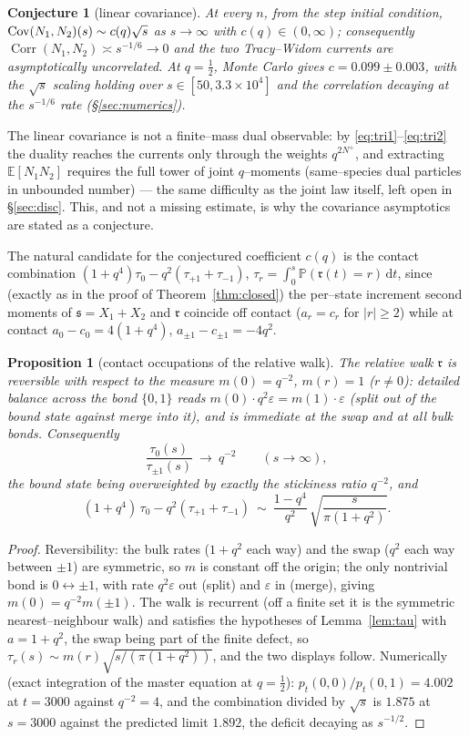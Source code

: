 \documentclass[11pt]{article}
\theoremstyle{plain}
\newtheorem{proposition}[theorem]{Proposition}
\newtheorem{conjecture}[theorem]{Conjecture}
\theoremstyle{definition}
\theoremstyle{remark}
\DeclareMathOperator{\Corr}{Corr}\DeclareMathOperator{\cum}{cum}
\newcommand{\E}{\mathbb{E}}\newcommand{\PP}{\mathbb{P}}\newcommand{\dd}{\,\mathrm{d}}
\newcommand{\eps}{\varepsilon}\newcommand{\Exp}{\mathrm{Exp}}
\begin{document}
\begin{conjecture}[linear covariance]\label{conj:cov}
At every $n$, from the step initial condition,
$\operatorname{Cov}(N_1,N_2)(s)\sim c(q)\sqrt s$ as $s\to\infty$ with $c(q)\in(0,\infty)$;
consequently $\Corr(N_1,N_2)\asymp s^{-1/6}\to0$ and the two Tracy--Widom currents
are asymptotically uncorrelated. At $q=\tfrac12$, Monte Carlo gives
$c=0.099\pm0.003$, with the $\sqrt s$ scaling holding over
$s\in[50,3.3\times10^4]$ and the correlation decaying at the $s^{-1/6}$ rate
(\S\ref{sec:numerics}).
\end{conjecture}

The linear covariance is not a finite--mass dual observable: by
\eqref{eq:tri1}--\eqref{eq:tri2} the duality reaches the currents only through the
weights $q^{2N^+}$, and extracting $\E[N_1N_2]$ requires the full tower of joint
$q$--moments (same--species dual particles in unbounded number) --- the same
difficulty as the joint law itself, left open in \S\ref{sec:disc}. This, and not a
missing estimate, is why the covariance asymptotics are stated as a conjecture.

The natural candidate for the conjectured coefficient $c(q)$ is the contact
combination
$(1+q^4)\tau_0-q^2(\tau_{+1}+\tau_{-1})$, $\tau_r=\int_0^s\PP(\mathfrak r(t)=r)\dd t$,
since (exactly as in the proof of Theorem~\ref{thm:closed}) the per--state increment
second moments of $\mathfrak s=X_1+X_2$ and $\mathfrak r$ coincide off contact
($a_r=c_r$ for $|r|\ge2$) while at contact $a_0-c_0=4(1+q^4)$,
$a_{\pm1}-c_{\pm1}=-4q^2$. 

\begin{proposition}[contact occupations of the relative walk]\label{prop:occ}
The relative walk $\mathfrak r$ is reversible with respect to the measure
$m(0)=q^{-2}$, $m(r)=1$ \textup($r\ne0$\textup): detailed balance across the bond
$\{0,1\}$ reads $m(0)\cdot q^2\eps=m(1)\cdot\eps$ \textup(split out of the bound state
against merge into it\textup), and is immediate at the swap and at all bulk bonds.
Consequently
\[
  \frac{\tau_0(s)}{\tau_{\pm1}(s)}\ \longrightarrow\ q^{-2}\qquad(s\to\infty),
\]
the bound state being overweighted by exactly the stickiness ratio $q^{-2}$, and
\[
  (1+q^4)\,\tau_0-q^2(\tau_{+1}+\tau_{-1})\ \sim\
  \frac{1-q^4}{q^{2}}\,\sqrt{\frac{s}{\pi(1+q^2)}}.
\]
\end{proposition}
\begin{proof}
Reversibility: the bulk rates ($1+q^2$ each way) and the swap ($q^2$ each way between
$\pm1$) are symmetric, so $m$ is constant off the origin; the only nontrivial bond is
$0\leftrightarrow\pm1$, with rate $q^2\eps$ out (split) and $\eps$ in (merge), giving
$m(0)=q^{-2}m(\pm1)$. The walk is recurrent (off a finite set it is the symmetric
nearest--neighbour walk) and satisfies the hypotheses of Lemma~\ref{lem:tau} with
$a=1+q^2$, the swap being part of the finite defect, so
$\tau_r(s)\sim m(r)\sqrt{s/(\pi(1+q^2))}$, and the two displays follow.
Numerically (exact integration of the master equation at $q=\tfrac12$):
$p_t(0,0)/p_t(0,1)=4.002$ at $t=3000$ against $q^{-2}=4$, and the combination divided
by $\sqrt s$ is $1.875$ at $s=3000$ against the predicted limit $1.892$, the deficit
decaying as $s^{-1/2}$.
\end{proof}
\end{document}
